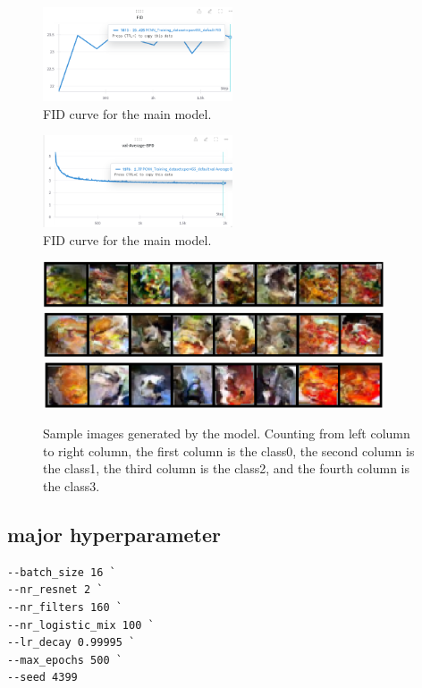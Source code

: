 \documentclass{article}
\begin{document}
\begin{figure}
    \centering
    \includegraphics[width=0.5\textwidth]{report_data/o-fid.png}
    \caption{ FID curve for the main model.}
    \label{fig:o-fid}
  \end{figure}

  \begin{figure}
    \centering
    \includegraphics[width=0.5\textwidth]{report_data/o-bpd.png}
    \caption{ FID curve for the main model.}
    \label{fig:F-FID}
  \end{figure}

  \begin{figure}
    \centering
    \includegraphics[width=0.9\textwidth]{report_data/o-1.png}
    \includegraphics[width=0.9\textwidth]{report_data/o-2.png}
    \includegraphics[width=0.9\textwidth]{report_data/o-3.png}
    \caption{ Sample images generated by the model. Counting from left column to right column, the first column is the class0, the second column is the class1, the third column is the class2, and the fourth column is the class3.}
    \label{fig:sample}
  \end{figure}

\subsection{major hyperparameter}
\begin{verbatim}
--batch_size 16 `
--nr_resnet 2 `
--nr_filters 160 `
--nr_logistic_mix 100 `
--lr_decay 0.99995 `
--max_epochs 500 `
--seed 4399
\end{verbatim}
\end{document}
